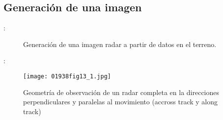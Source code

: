\subsection{Generación de una imagen}
\begin{frame}{\secname : \subsecname}
  \begin{figure}
    \centering
    \caption{Generación de una imagen radar a partir de datos en el terreno.}
    \label{}
  \end{figure}
\end{frame}


\begin{frame}{\secname : \subsecname}
  \begin{figure}
    \centering
    \texttt{[image: 01938fig13\_1.jpg]}
    \caption{Geometría de observación de un radar completa en la direcciones perpendiculares y paralelas al movimiento (accross track y along track)}
    \label{}
  \end{figure}
\end{frame}

